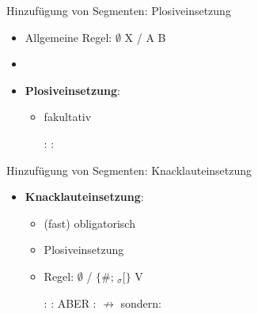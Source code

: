 
\begin{frame}{Hinzufügung von Segmenten: Plosiveinsetzung}

\begin{itemize}
	\item Allgemeine Regel: $\emptyset$ \ras X / A \underline{\quad} B
	\item[]
	\item \textbf{Plosiveinsetzung}:
	
	\begin{itemize}
		\item fakultativ
		
	\eal
		\ex {}:  \ras \textipa{[Pampt]}
		\ex {}:  \ras \textipa{[gants]}
	\zl
	
	\end{itemize}

\end{itemize}
\end{frame}


\begin{frame}{Hinzufügung von Segmenten: Knacklauteinsetzung}

\begin{itemize}
	\item \textbf{Knacklauteinsetzung}:

	\begin{itemize}
		\item (fast) obligatorisch
		\item Plosiveinsetzung
		\item Regel: $\emptyset$ \ras \textipa{[P]} / 
		$\{$\#; \textprimstress$_\sigma[\}$ 
\underline{\quad} V

	\eal
		\ex {}:  \ras {}
		\ex {}:  \ras \textipa{[Pa\t{pf}@l]}
		\ex ABER :  $\nrightarrow$ \textipa{[\textprimstress ge:.P@n]} sondern: \textipa{[\textprimstress ge:.@n]}
	\zl
	
	\end{itemize}
			
\end{itemize}

\end{frame}


